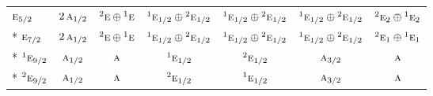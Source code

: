 \documentclass[10pt,a4paper]{article}
\numberwithin{equation}{section}
\newcommand{\irr}[1]{\text{\normalfont\scshape #1}}
\newcommand{\conjpair}[1]{{}^{#1}}
\begin{document}
{\begin{longtable}{@{}lcccccc@{}}
$\irr{e}_{5/2}$ & $2\,\irr{a}_{1/2}$ & $\conjpair{2}\irr{e}\oplus \conjpair{1}\irr{e}$ & $\conjpair{1}\irr{e}_{1/2}\oplus \conjpair{2}\irr{e}_{1/2}$ & $\conjpair{1}\irr{e}_{1/2}\oplus \conjpair{2}\irr{e}_{1/2}$ & $\conjpair{1}\irr{e}_{1/2}\oplus \conjpair{2}\irr{e}_{1/2}$ & $\conjpair{2}\irr{e}_{2}\oplus \conjpair{1}\irr{e}_{2}$\\*
$\irr{e}_{7/2}$ & $2\,\irr{a}_{1/2}$ & $\conjpair{2}\irr{e}\oplus \conjpair{1}\irr{e}$ & $\conjpair{1}\irr{e}_{1/2}\oplus \conjpair{2}\irr{e}_{1/2}$ & $\conjpair{1}\irr{e}_{1/2}\oplus \conjpair{2}\irr{e}_{1/2}$ & $\conjpair{1}\irr{e}_{1/2}\oplus \conjpair{2}\irr{e}_{1/2}$ & $\conjpair{2}\irr{e}_{1}\oplus \conjpair{1}\irr{e}_{1}$\\*
$\conjpair{1}\irr{e}_{9/2}$ & $\irr{a}_{1/2}$ & $\irr{a}$ & $\conjpair{1}\irr{e}_{1/2}$ & $\conjpair{2}\irr{e}_{1/2}$ & $\irr{a}_{3/2}$ & $\irr{a}$\\*
$\conjpair{2}\irr{e}_{9/2}$ & $\irr{a}_{1/2}$ & $\irr{a}$ & $\conjpair{2}\irr{e}_{1/2}$ & $\conjpair{1}\irr{e}_{1/2}$ & $\irr{a}_{3/2}$ & $\irr{a}$\\
\bottomrule\end{longtable}}
\end{document}
